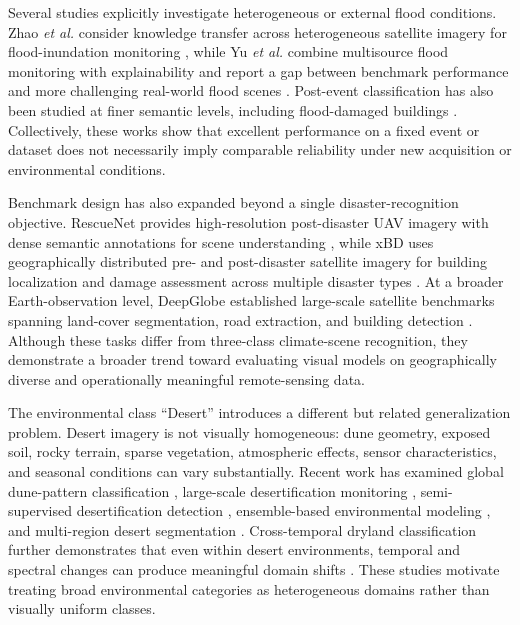 Several studies explicitly investigate heterogeneous or external flood conditions. Zhao \textit{et al.} consider knowledge transfer across heterogeneous satellite imagery for flood-inundation monitoring \cite{zhao2024hfienet}, while Yu \textit{et al.} combine multisource flood monitoring with explainability and report a gap between benchmark performance and more challenging real-world flood scenes \cite{yu2026floodxai}. Post-event classification has also been studied at finer semantic levels, including flood-damaged buildings \cite{wu2024postflood}. Collectively, these works show that excellent performance on a fixed event or dataset does not necessarily imply comparable reliability under new acquisition or environmental conditions.

Benchmark design has also expanded beyond a single disaster-recognition objective. RescueNet provides high-resolution post-disaster UAV imagery with dense semantic annotations for scene understanding \cite{rahnemoonfar2023rescuenet}, while xBD uses geographically distributed pre- and post-disaster satellite imagery for building localization and damage assessment across multiple disaster types \cite{gupta2019xbd}. At a broader Earth-observation level, DeepGlobe established large-scale satellite benchmarks spanning land-cover segmentation, road extraction, and building detection \cite{demir2018deepglobe}. Although these tasks differ from three-class climate-scene recognition, they demonstrate a broader trend toward evaluating visual models on geographically diverse and operationally meaningful remote-sensing data.


The environmental class ``Desert'' introduces a different but related generalization problem. Desert imagery is not visually homogeneous: dune geometry, exposed soil, rocky terrain, sparse vegetation, atmospheric effects, sensor characteristics, and seasonal conditions can vary substantially. Recent work has examined global dune-pattern classification \cite{zheng2024globaldunes}, large-scale desertification monitoring \cite{chouikhi2025africadesert}, semi-supervised desertification detection \cite{harrou2024desertification}, ensemble-based environmental modeling \cite{boali2024desertensemble}, and multi-region desert segmentation \cite{wang2026dbessdnet}. Cross-temporal dryland classification further demonstrates that even within desert environments, temporal and spectral changes can produce meaningful domain shifts \cite{zhan2026sanddomain}. These studies motivate treating broad environmental categories as heterogeneous domains rather than visually uniform classes.

